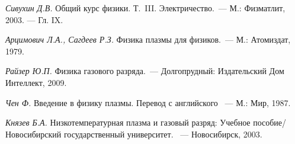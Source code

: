 \begin{lab:literature}

\item \textit{Сивухин Д.В.} Общий курс физики. Т.~III. Электричество.~--- М.:
Физматлит, 2003. --- Гл. IX.

\item \textit{Арцимович Л.А., Сагдеев Р.З.} Физика плазмы для физиков.~---
М.: Атомиздат, 1979.

\item \textit{Райзер Ю.П.} Физика газового разряда.~--- Долгопрудный: Издательский
Дом Интеллект, 2009.

\item \textit{Чен Ф.} Введение в физику плазмы. Перевод с английского ~--- М.:
Мир, 1987.

\item \textit{Князев Б.А.} Низкотемпературная плазма и газовый разряд: Учебное
пособие/ Новосибирский государственный университет. ~--- Новосибирск, 2003.
\end{lab:literature}
